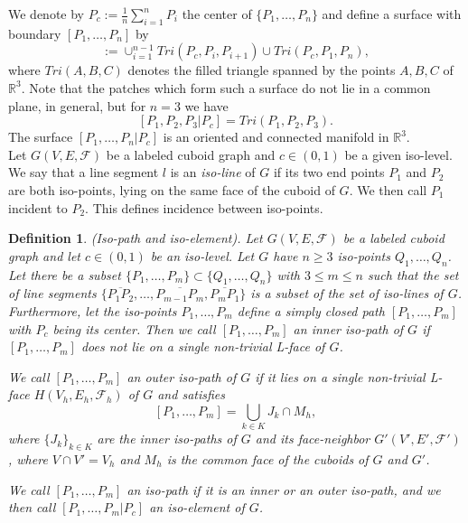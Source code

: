 \documentclass[a4paper,11pt]{article}
\newtheorem{definition}[theorem]{Definition}
\begin{document}
We denote by $P_c:=\frac{1}{n}\sum_{i=1}^nP_i$ the center of $\{P_1,\ldots,P_n\}$ and define a surface with
boundary $[P_1,\ldots,P_n]$ by
\begin{equation}
[P_1,\ldots,P_n|P_c]:=\cup_{i=1}^{n-1}Tri(P_c,P_i,P_{i+1})\cup Tri(P_c,P_1,P_n),
\label{eq:labeled-graph-13}
\end{equation}
where $Tri(A,B,C)$ denotes the filled triangle spanned by the points $A,B,C$ of
$\mathbb{R}^3$. Note that the patches
which form such a surface do not lie in a common plane, in general, but for $n=3$ we have
\[
[P_1,P_2,P_3|P_c]=Tri(P_1,P_2,P_3).
\]
The surface $[P_1,\ldots,P_n|P_c]$ is an oriented and connected manifold in $\mathbb{R}^3$.\\

Let $G(V,E,\mathcal{F})$ be a labeled cuboid graph and $c\in (0,1)$ be a
given iso-level. We say that a line segment $l$ is an {\it iso-line} of $G$ if its two end points
$P_1$ and $P_2$ are both iso-points, lying on the same face of the cuboid of $G$. We then call $P_1$
incident to $P_2$. This defines incidence between iso-points.

\begin{definition}(Iso-path and iso-element). Let $G(V,E,\mathcal{F})$ be a labeled
cuboid graph and let $c\in (0,1)$ be an iso-level. Let $G$ have $n\geq 3$ iso-points
$Q_1,\ldots,Q_n$. Let there be a subset $\{P_1,\ldots,P_m\}\subset\{Q_1,\ldots,Q_n\}$ with $3\leq m\leq n$
such that the set of line segments $\{\overline{P_1P_2},\ldots,\overline{P_{m-1}P_m}, \overline{P_mP_1}\}$
is a subset of the set of iso-lines of $G$. Furthermore, let the iso-points $P_1,\ldots,P_m$
define a simply closed path $[P_1,\ldots,P_m]$ with $P_c$ being its center. Then we call $[P_1,\ldots,P_m]$
an inner iso-path of $G$ if $[P_1,\ldots,P_m]$ does not lie on a single non-trivial L-face of $G$.

We call $[P_1,\ldots,P_m]$ an outer iso-path of $G$ if it lies on a single non-trivial L-face
$H(V_h,E_h,\mathcal{F}_h)$ of $G$ and satisfies
\[
[P_1,\ldots,P_m]=\bigcup_{k\in K}J_k\cap M_h,
\]
where $\{J_k\}_{k\in K}$ are the inner iso-paths of $G$ and its face-neighbor $G'(V',E',\mathcal{F}')$,
where $V\cap V'=V_h$ and $M_h$ is the common face of the cuboids of $G$ and $G'$.

We call $[P_1,\ldots,P_m]$ an iso-path if it is an inner or an outer iso-path, and we then call
$[P_1,\ldots,P_m|P_c]$ an iso-element of $G$.
\label{def:labeled-graph-6}
\end{definition}
\end{document}
